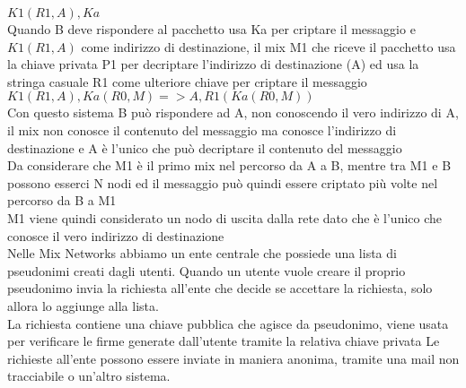 $K1(R1, A), Ka$ \\
Quando B deve rispondere al pacchetto usa Ka per criptare il messaggio e $K1(R1, A)$ come indirizzo di destinazione, il mix M1 che riceve il pacchetto usa la chiave privata P1 per decriptare l'indirizzo di destinazione (A) ed usa la stringa casuale R1 come ulteriore chiave per criptare il messaggio \\
$K1( R1, A ), Ka( R0, M ) => A, R1( Ka( R0, M ) )$ \\
Con questo sistema B può rispondere ad A, non conoscendo il vero indirizzo di A, il mix non conosce il contenuto del messaggio ma conosce l'indirizzo di destinazione e A è l'unico che può decriptare il contenuto del messaggio \\
Da considerare che M1 è il primo mix nel percorso da A a B, mentre tra M1 e B possono esserci N nodi ed il messaggio può quindi essere criptato più volte nel percorso da B a M1 \\
M1 viene quindi considerato un nodo di uscita dalla rete dato che è l'unico che conosce il vero indirizzo di destinazione \\
Nelle Mix Networks abbiamo un ente centrale che possiede una lista di pseudonimi creati dagli utenti. Quando un utente vuole creare il proprio pseudonimo invia la richiesta all'ente che decide se accettare la richiesta, solo allora lo aggiunge alla lista. \\
La richiesta contiene una chiave pubblica che agisce da pseudonimo, viene usata per verificare le firme generate dall'utente tramite la relativa chiave privata 
Le richieste all'ente possono essere inviate in maniera anonima, tramite una mail non tracciabile o un'altro sistema. \\
\cite{ChaumMixes}

